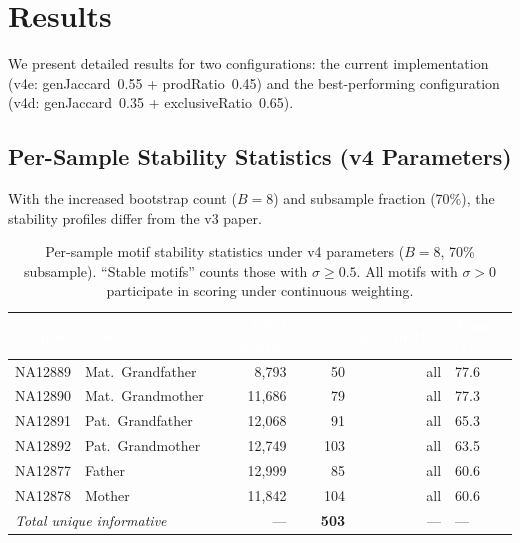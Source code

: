 \documentclass{../yalumba}
\begin{document}
\section{Results}
\label{sec:results}

We present detailed results for two configurations: the current implementation
(v4e: genJaccard~0.55 + prodRatio~0.45) and the best-performing configuration
(v4d: genJaccard~0.35 + exclusiveRatio~0.65).

\subsection{Per-Sample Stability Statistics (v4 Parameters)}

With the increased bootstrap count ($B = 8$) and subsample fraction (70\%),
the stability profiles differ from the v3 paper.

\begin{table}[H]
  \centering
  \tablestyle
  \caption{Per-sample motif stability statistics under v4 parameters ($B = 8$,
    70\% subsample).  ``Stable motifs'' counts those with $\sigma \geq 0.5$.
    All motifs with $\sigma > 0$ participate in scoring under continuous weighting.}
  \label{tab:v4-stability}
  \begin{tabular}{llrrrl}
    \toprule
    \rowcolor{table-header}
    \textcolor{white}{\textbf{Sample}} &
    \textcolor{white}{\textbf{Role}} &
    \textcolor{white}{\textbf{Total Motifs}} &
    \textcolor{white}{\textbf{$\sigma \geq 0.5$}} &
    \textcolor{white}{\textbf{Informative}} &
    \textcolor{white}{\textbf{Time (s)}} \\
    \midrule
    NA12889 & Mat.\ Grandfather & 8{,}793 & 50  & all & 77.6 \\
    NA12890 & Mat.\ Grandmother & 11{,}686 & 79  & all & 77.3 \\
    NA12891 & Pat.\ Grandfather & 12{,}068 & 91  & all & 65.3 \\
    NA12892 & Pat.\ Grandmother & 12{,}749 & 103 & all & 63.5 \\
    NA12877 & Father            & 12{,}999 & 85  & all & 60.6 \\
    NA12878 & Mother            & 11{,}842 & 104 & all & 60.6 \\
    \midrule
    \multicolumn{2}{l}{\textit{Total unique informative}} & --- & \textbf{503} & --- & --- \\
    \bottomrule
  \end{tabular}
\end{table}
\end{document}
